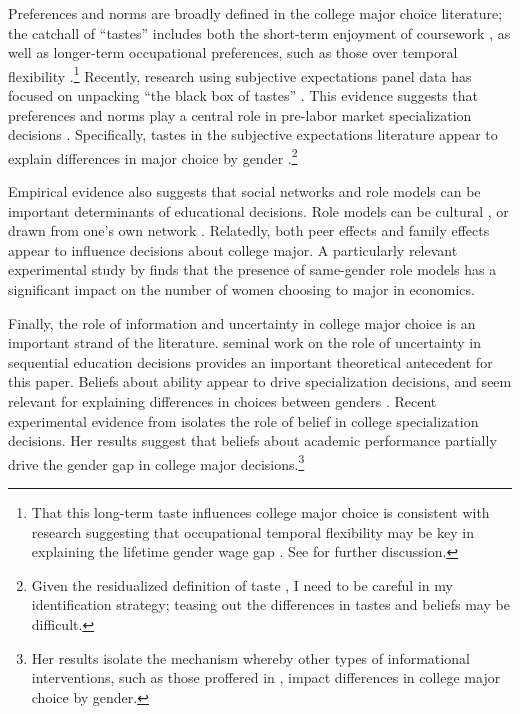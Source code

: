 Preferences and norms are broadly defined in the college major choice literature;
the catchall of ``tastes'' includes both the short-term enjoyment of coursework \parencite{Z13}, as well as longer-term occupational preferences, such as those over temporal flexibility \parencite{WZ18}.\footnote{
    That this long-term taste influences college major choice is consistent with research suggesting that occupational temporal flexibility may be key in explaining the lifetime gender wage gap \parencite{G14,KLS19}.
    See \textcite{WZ18} for further discussion.
}
Recently, research using subjective expectations panel data has focused on unpacking ``the black box of tastes'' \parencite{PWZ20}.
This evidence suggests that preferences and norms play a central role in pre-labor market specialization decisions \parencite{WZ15,AHMR20}.
Specifically, tastes in the subjective expectations literature appear to explain differences in major choice by gender \parencite{WZ18}.\footnote{
    Given the residualized definition of taste \parencite{WZ15}, I need to be careful in my identification strategy; teasing out the differences in tastes and beliefs may be difficult.
}

Empirical evidence also suggests that social networks and role models can be important determinants of educational decisions.
Role models can be cultural \parencite{R19}, or drawn from one's own network \parencite{LM20}.
Relatedly, both peer effects \parencite{DPR10} and family effects \parencite{NAABDK20-wp} appear to influence decisions about college major.
A particularly relevant experimental study by \textcite{PS20} finds that the presence of same-gender role models has a significant impact on the number of women choosing to major in economics.


Finally, the role of information and uncertainty in college major choice is an important strand of the literature. 
 seminal work on the role of uncertainty in sequential education decisions provides an important theoretical antecedent for this paper.
Beliefs about ability appear to drive specialization decisions, and seem relevant for explaining differences in choices between genders \parencite{A04,AHK12,AAM16-education}.
Recent experimental evidence from \textcite{O20} isolates the role of belief in college specialization decisions. 
Her results suggest that beliefs about academic performance partially drive the gender gap in college major decisions.\footnote{
    Her results isolate the mechanism whereby other types of informational interventions, such as those proffered in \textcite{PS20,BBL19,L18}, impact differences in college major choice by gender.   
}


